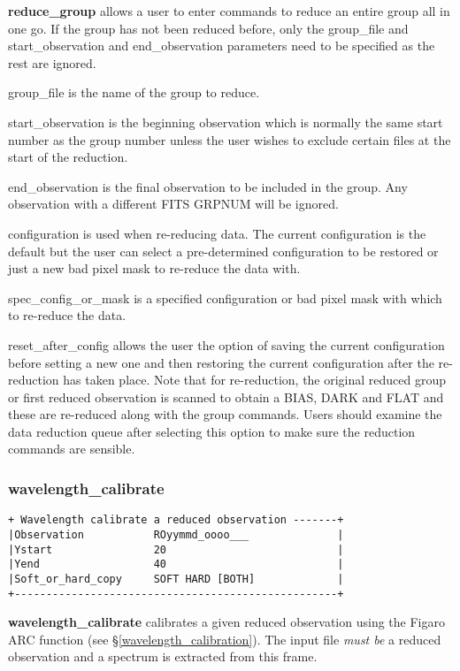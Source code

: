 {{\bf reduce\_group} allows a user to enter commands to reduce an entire group
all in one go.  If the group has not been reduced before, only the 
{\sf group\_file} and {\sf start\_observation} and {\sf end\_observation} 
parameters need to be specified as the rest are ignored. 

{\sf group\_file} is the name of the group to reduce.

{\sf start\_observation} is the beginning observation which is normally the
same start number as the group number unless the user wishes to exclude
certain files at the start of the reduction.

{\sf end\_observation} is the final observation to be included in the
group. Any observation with a different FITS GRPNUM  will be ignored.

{\sf configuration}  is used when re-reducing data. The current configuration
is the default but the user can select a pre-determined configuration to be
restored or just a new bad pixel mask to re-reduce the data with.

{\sf spec\_config\_or\_mask} is a specified  configuration or bad pixel mask
with which to re-reduce the data.

{\sf reset\_after\_config} allows the user the option of saving the current
configuration before setting a new one and then restoring the current
configuration after the re-reduction has taken place.
Note that for re-reduction, the original reduced group or first reduced
observation is scanned to obtain a {\sf BIAS}, {\sf DARK} and {\sf FLAT} 
and these are re-reduced along with the group commands. Users should examine the data
reduction queue after selecting this option to make sure the reduction 
commands are sensible.

\subsubsection{wavelength\_calibrate}
\label{wavelength_calibrate}
\begin{verbatim}
+ Wavelength calibrate a reduced observation -------+
|Observation           ROyymmd_oooo___              |
|Ystart                20                           |
|Yend                  40                           |
|Soft_or_hard_copy     SOFT HARD [BOTH]             |
+---------------------------------------------------+
\end{verbatim}

{\bf wavelength\_calibrate} calibrates a given reduced observation using the
Figaro ARC function (see \S \ref{wavelength_calibration}). The input file
{\em must be} a reduced observation and a spectrum is extracted from
this frame.

}
